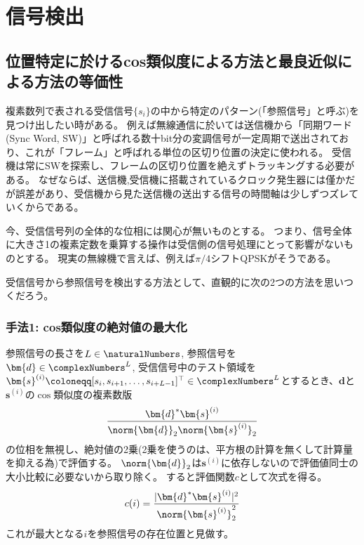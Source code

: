 \chapter{信号検出}
    \section{位置特定に於けるcos類似度による方法と最良近似による方法の等価性}
        複素数列で表される受信信号$\{s_i\}$の中から特定のパターン(「参照信号」と呼ぶ)を見つけ出したい時がある。
        例えば無線通信に於いては送信機から「同期ワード (Sync Word, SW)」と呼ばれる数十bit分の変調信号が一定周期で送出されており、これが「フレーム」と呼ばれる単位の区切り位置の決定に使われる。
        受信機は常にSWを探索し、フレームの区切り位置を絶えずトラッキングする必要がある。
        なぜならば、送信機,受信機に搭載されているクロック発生器には僅かだが誤差があり、受信機から見た送信機の送出する信号の時間軸は少しずつズレていくからである。
        \par
        今、受信信号列の全体的な位相には関心が無いものとする。
        つまり、信号全体に大きさ1の複素定数を乗算する操作は受信側の信号処理にとって影響がないものとする。
        現実の無線機で言えば、例えば$\pi/4$シフトQPSKがそうである。
        \par
        受信信号から参照信号を検出する方法として、直観的に次の2つの方法を思いつくだろう。
        \subsection{手法1: cos類似度の絶対値の最大化}
            \label{手法1: cos類似度の絶対値の最大化}
            参照信号の長さを$L\in\naturalNumbers$, 参照信号を$\bm{d} \in \complexNumbers^L$, 受信信号中のテスト領域を$\bm{s}^{(i)} \coloneqq [s_i,s_{i+1},\dots,s_{i+L-1}]^\top \in \complexNumbers^L$とするとき、$\bm{d}$と$\bm{s}^{(i)}$の$\cos$類似度の複素数版
            \[ \frac{\bm{d}^*\bm{s}^{(i)}}{\norm{\bm{d}}_2\norm{\bm{s}^{(i)}}_2} \]
            の位相を無視し、絶対値の2乗(2乗を使うのは、平方根の計算を無くして計算量を抑える為)で評価する。
            $\norm{\bm{d}}_2$は$\bm{s}^{(i)}$に依存しないので評価値同士の大小比較に必要ないから取り除く。
            すると評価関数$c$として次式を得る。
            \[ c(i) = \frac{|\bm{d}^*\bm{s}^{(i)}|^2}{\norm{\bm{s}^{(i)}}_2^2} \]
            これが最大となる$i$を参照信号の存在位置と見做す。
